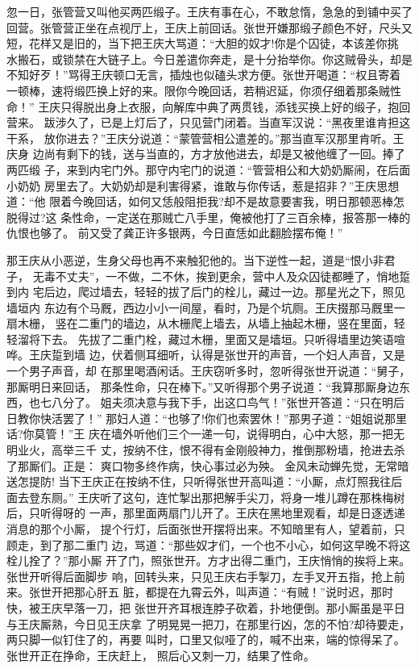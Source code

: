 忽一日，张管营又叫他买两匹缎子。王庆有事在心，不敢怠惰，急急的到铺中买了
回营。张管营正坐在点视厅上，王庆上前回话。张世开嫌那缎子颜色不好，尺头又
短，花样又是旧的，当下把王庆大骂道：“大胆的奴才!你是个囚徒，本该差你挑
水搬石，或锁禁在大链子上。今日差遣你奔走，是十分抬举你。你这贼骨头，却是
不知好歹！”骂得王庆顿口无言，插烛也似磕头求方便。张世开喝道：“权且寄着
一顿棒，速将缎匹换上好的来。限你今晚回话，若稍迟延，你须仔细着那条贼性命！”
王庆只得脱出身上衣服，向解库中典了两贯钱，添钱买换上好的缎子，抱回营来。
跋涉久了，已是上灯后了，只见营门闭着。当直军汉说：“黑夜里谁肯担这干系，
放你进去？”王庆分说道：“蒙管营相公遣差的。”那当直军汉那里肯听。王庆身
边尚有剩下的钱，送与当直的，方才放他进去，却是又被他缠了一回。捧了两匹缎
子，来到内宅门外。那守内宅门的说道：“管营相公和大奶奶厮闹，在后面小奶奶
房里去了。大奶奶却是利害得紧，谁敢与你传话，惹是招非？”王庆思想道：“他
限着今晚回话，如何又恁般阻拒我?却不是故意要害我，明日那顿恶棒怎脱得过?这
条性命，一定送在那贼亡八手里，俺被他打了三百余棒，报答那一棒的仇恨也够了。
前又受了龚正许多银两，今日直恁如此翻脸摆布俺！”

那王庆从小恶逆，生身父母也再不来触犯他的。当下逆性一起，道是“恨小非君子，
无毒不丈夫”，一不做，二不休，挨到更余，营中人及众囚徒都睡了，悄地踅到内
宅后边，爬过墙去，轻轻的拔了后门的栓儿，藏过一边。那星光之下，照见墙垣内
东边有个马厩，西边小小一间屋，看时，乃是个坑厕。王庆掇那马厩里一扇木栅，
竖在二重门的墙边，从木栅爬上墙去，从墙上抽起木栅，竖在里面，轻轻溜将下去。
先拔了二重门栓，藏过木栅，里面又是墙垣。只听得墙里边笑语喧哗。王庆踅到墙
边，伏着侧耳细听，认得是张世开的声音，一个妇人声音，又是一个男子声音，却
在那里喝酒闲话。王庆窃听多时，忽听得张世开说道：“舅子，那厮明日来回话，
那条性命，只在棒下。”又听得那个男子说道：“我算那厮身边东西，也七八分了。
姐夫须决意与我下手，出这口鸟气！”张世开答道：“只在明后日教你快活罢了！”
那妇人道：“也够了!你们也索罢休！”那男子道：“姐姐说那里话?你莫管！”王
庆在墙外听他们三个一递一句，说得明白，心中大怒，那一把无明业火，高举三千
丈，按纳不住，恨不得有金刚般神力，推倒那粉墙，抢进去杀了那厮们。正是：
爽口物多终作病，快心事过必为殃。
金风未动蝉先觉，无常暗送怎提防!
当下王庆正在按纳不住，只听得张世开高叫道：“小厮，点灯照我往后面去登东厕。”
王庆听了这句，连忙掣出那把解手尖刀，将身一堆儿蹲在那株梅树后，只听得呀的
一声，那里面两扇门儿开了。王庆在黑地里观看，却是日逐透递消息的那个小厮，
提个行灯，后面张世开摆将出来。不知暗里有人，望着前，只顾走，到了那二重门
边，骂道：“那些奴才们，一个也不小心，如何这早晚不将这栓儿拴了？”那小厮
开了门，照张世开。方才出得二重门，王庆悄悄的挨将上来。张世开听得后面脚步
响，回转头来，只见王庆右手掣刀，左手叉开五指，抢上前来。张世开把那心肝五
脏，都提在九霄云外，叫声道：“有贼！”说时迟，那时快，被王庆早落一刀，把
张世开齐耳根连脖子砍着，扑地便倒。那小厮虽是平日与王庆厮熟，今日见王庆拿
了明晃晃一把刀，在那里行凶，怎的不怕?却待要走，两只脚一似钉住了的，再要
叫时，口里又似哑了的，喊不出来，端的惊得呆了。张世开正在挣命，王庆赶上，
照后心又刺一刀，结果了性命。

